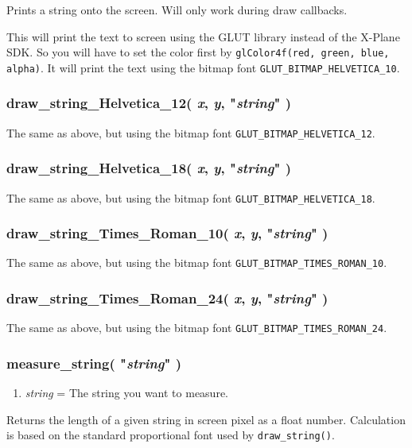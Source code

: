 \documentclass[11pt,parskip=half,a4paper]{scrartcl}
\begin{document}
Prints a string onto the screen. Will only work during draw callbacks.

This will print the text to screen using the GLUT library instead of the X-Plane SDK. So you will have to set the color first by \verb|glColor4f(red, green, blue, alpha)|. It will print the text using the bitmap font \verb|GLUT_BITMAP_HELVETICA_10|.

\subsubsection{draw\_string\_Helvetica\_12( \emph{x}, \emph{y}, "\emph{string}" )}

The same as above, but using the bitmap font \verb|GLUT_BITMAP_HELVETICA_12|.

\subsubsection{draw\_string\_Helvetica\_18( \emph{x}, \emph{y}, "\emph{string}" )}

The same as above, but using the bitmap font \verb|GLUT_BITMAP_HELVETICA_18|.

\subsubsection{draw\_string\_Times\_Roman\_10( \emph{x}, \emph{y}, "\emph{string}" )}

The same as above, but using the bitmap font \verb|GLUT_BITMAP_TIMES_ROMAN_10|.

\subsubsection{draw\_string\_Times\_Roman\_24( \emph{x}, \emph{y}, "\emph{string}" )}

The same as above, but using the bitmap font \verb|GLUT_BITMAP_TIMES_ROMAN_24|.


\subsubsection{measure\_string( "\emph{string}" )}

\begin{enumerate}
	\item \emph{string} = The string you want to measure.
\end{enumerate}

Returns the length of a given string in screen pixel as a float number. Calculation is based on the standard proportional font used by \verb|draw_string()|.
\end{document}
